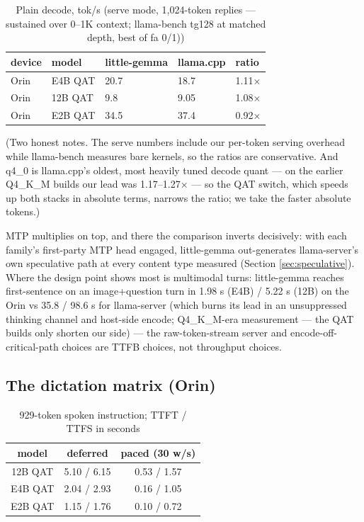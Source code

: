 \documentclass{article}
\begin{document}
\begin{table}[H]
	\centering
	\begin{tabularx}{\textwidth}{l X X X X}
		\toprule
		device & model  & little-gemma  & llama.cpp & ratio\\
		\midrule
		Orin & E4B QAT & 20.7 & 18.7 & 1.11×\\
		Orin & 12B QAT & 9.8 & 9.05 & 1.08×\\
        Orin & E2B QAT & 34.5 & 37.4 & 0.92×\\
		\bottomrule
	\end{tabularx}
	\caption{Plain decode, tok/s (serve mode, 1,024-token replies --- sustained over 0--1K context; llama-bench tg128 at matched depth, best of fa 0/1))}
	\label{tab:plain-decode}
\end{table}

(Two honest notes. The serve numbers include our per-token serving overhead while llama-bench measures bare kernels, so the ratios are conservative. And q4\_0 is llama.cpp's oldest, most heavily tuned decode quant --- on the earlier Q4\_K\_M builds our lead was 1.17--1.27× --- so the QAT switch, which speeds up both stacks in absolute terms, narrows the ratio; we take the faster absolute tokens.)

MTP multiplies on top, and there the comparison inverts decisively: with each family's first-party MTP head engaged, little-gemma out-generates llama-server's own speculative path at every content type measured (Section \ref{sec:speculative}). Where the design point shows most is multimodal turns: little-gemma reaches first-sentence on an image+question turn in 1.98 s (E4B) / 5.22 s (12B) on the Orin vs 35.8 / 98.6 s for llama-server (which burns its lead in an unsuppressed thinking channel and host-side encode; Q4\_K\_M-era measurement --- the QAT builds only shorten our side) --- the raw-token-stream server and encode-off-critical-path choices are TTFB choices, not throughput choices.

\subsection{The dictation matrix (Orin)}
\label{sec:dictmatrix}

\begin{table}[H]
	\centering
	\begin{tabular}{ccc}
		\toprule
		model & deferred & paced (30 w/s) \\
		\midrule
		12B QAT & 5.10 / 6.15 & 0.53 / 1.57 \\
		E4B QAT & 2.04 / 2.93 & 0.16 / 1.05 \\
		E2B QAT & 1.15 / 1.76 & 0.10 / 0.72\\
		\bottomrule
	\end{tabular}
	\caption{929-token spoken instruction; TTFT / TTFS in seconds}
	\label{tab:929-token}
\end{table}
\end{document}
